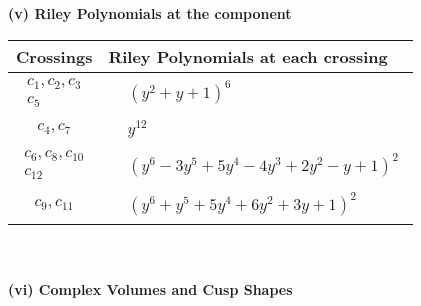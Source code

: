 \documentclass[1p]{elsarticle_modified}
\theoremstyle{definition}
\begin{document}
\newpage\renewcommand{\arraystretch}{1}
\flushleft \textbf{(v) Riley Polynomials at the component}\newline \\
\begin{tabular}{m{50pt}|m{274pt}}
Crossings & \hspace{64pt}Riley Polynomials at each crossing \\
\hline $$\begin{aligned}c_{1},c_{2},c_{3}\\c_{5}\end{aligned}$$&$\begin{aligned}
&(y^2+y+1)^6
\end{aligned}$\\
\hline $$\begin{aligned}c_{4},c_{7}\end{aligned}$$&$\begin{aligned}
&y^{12}
\end{aligned}$\\
\hline $$\begin{aligned}c_{6},c_{8},c_{10}\\c_{12}\end{aligned}$$&$\begin{aligned}
&(y^6-3 y^5+5 y^4-4 y^3+2 y^2- y+1)^2
\end{aligned}$\\
\hline $$\begin{aligned}c_{9},c_{11}\end{aligned}$$&$\begin{aligned}
&(y^6+y^5+5 y^4+6 y^2+3 y+1)^2
\end{aligned}$\\
\hline
\end{tabular}\\~\\
\newpage\flushleft \textbf{(vi) Complex Volumes and Cusp Shapes}
\end{document}
